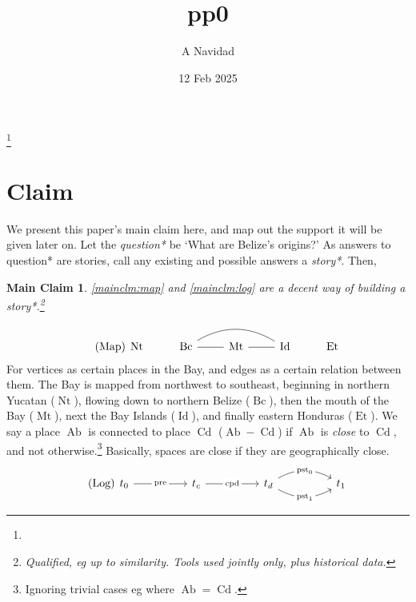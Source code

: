 \documentclass{amsart}
\newcommand{\mention}[1]{\textit{#1}}%
\DeclareMathOperator{\ab}{Ab}%
\DeclareMathOperator{\cd}{Cd}%
\DeclareMathOperator{\id}{Id}%
\DeclareMathOperator{\mt}{Mt}%
\DeclareMathOperator{\bc}{Bc}%
\DeclareMathOperator{\et}{Et}%
\DeclareMathOperator{\nt}{Nt}%
\DeclareMathOperator{\pre}{pre}%
\DeclareMathOperator{\pst}{pst}%
\DeclareMathOperator{\cpd}{cpd}%
\newtheorem{mainclm}{Main Claim}%
\theoremstyle{definition}
\theoremstyle{remark}
\begin{document}
%
%
\label{start}
\title{pp0}
\author{A Navidad}
\address{Harvard College, Cambridge MA}
\date{12 Feb 2025}
\thanks{}%
\begin{abstract}
\end{abstract}
\keywords{}
\maketitle
%
%
%
\section{Claim}
	\label{s:claim}
	We present this paper's main claim here, and map out the support it will be given later on. Let the \mention{question*} be `What are Belize's origins?' As answers to question* are stories, call any existing and possible answers a \mention{story*}. Then,
	\begin{mainclm}
	\label{mainclm:1}
	\ref{mainclm:map} and \ref{mainclm:log} are a decent way of building a story*.\footnote{Qualified, eg up to similarity. Tools used jointly only, plus historical data.}
	\end{mainclm}
	\begin{equation}
	\tag{Map}
	\label{mainclm:map}
		\begin{tikzcd}[arrows=dash]
		\nt &\bc \rar \ar[rr,bend left] &\mt \rar &\id &\et
		\end{tikzcd}
	\end{equation}
	For vertices as certain places in the Bay, and edges as a certain relation between them. The Bay is mapped from northwest to southeast, beginning in northern Yucatan (\(\nt\)), flowing down to northern Belize (\(\bc\)), then the mouth of the Bay (\(\mt\)), next the Bay Islands (\(\id\)), and finally eastern Honduras (\(\et\)). We say a place \(\ab\) is connected to place \(\cd\) (\(\ab-\cd\)) if \(\ab\) is \mention{close} to \(\cd\), and not otherwise.\footnote{Ignoring trivial cases eg where \(\ab=\cd\).} Basically, spaces are close if they are geographically close.
	\begin{equation}
	\tag{Log}
	\label{mainclm:log}
		\begin{tikzcd}[sep=huge]
		t_{0} \rar["\pre" description] &t_{c} \rar["\cpd" description] &t_{d} \rar[bend left,"\pst_{0}" description] \rar[bend right,"\pst_{1}" description] &t_{1}
		\end{tikzcd}
	\end{equation}
\end{document}

